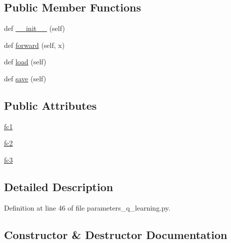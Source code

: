 \subsection*{Public Member Functions}
\begin{DoxyCompactItemize}
\item 
def \hyperlink{classparameters__q__learning_1_1_neural_q_estimator_aa30a87de66858edd43d447a0e43df15f}{\+\_\+\+\_\+init\+\_\+\+\_\+} (self)
\item 
def \hyperlink{classparameters__q__learning_1_1_neural_q_estimator_a5321b2786864ecc13f79a69aacffdf9d}{forward} (self, x)
\item 
def \hyperlink{classparameters__q__learning_1_1_neural_q_estimator_a6746779234d0888fc990fb5dc1539e18}{load} (self)
\item 
def \hyperlink{classparameters__q__learning_1_1_neural_q_estimator_aeb2bfb76d57dfb0116bc43b6a5dcb57e}{save} (self)
\end{DoxyCompactItemize}
\subsection*{Public Attributes}
\begin{DoxyCompactItemize}
\item 
\hyperlink{classparameters__q__learning_1_1_neural_q_estimator_a738d6af429497304e001221caf8fe478}{fc1}
\item 
\hyperlink{classparameters__q__learning_1_1_neural_q_estimator_a8aea853cf6307c617096ec84568101a6}{fc2}
\item 
\hyperlink{classparameters__q__learning_1_1_neural_q_estimator_ad7204b9e83acb51e02e89dd40507daab}{fc3}
\end{DoxyCompactItemize}


\subsection{Detailed Description}


Definition at line 46 of file parameters\+\_\+q\+\_\+learning.\+py.



\subsection{Constructor \& Destructor Documentation}
